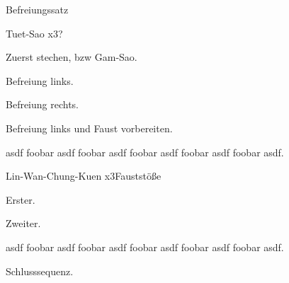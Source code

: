 
\begin{WTSatz}{Befreiungssatz}%

	
	\begin{WTSatzTeil}{Tuet-Sao x3}{?}
	
		Zuerst stechen, bzw Gam-Sao.
		
		
		Befreiung links.
		
		
		Befreiung rechts.
		
		
		Befreiung links und Faust vorbereiten.
		

		asdf foobar asdf foobar asdf foobar asdf foobar asdf foobar asdf.
	\end{WTSatzTeil}
	\begin{WTSatzTeil}{Lin-Wan-Chung-Kuen x3}{Faustst\"o{\ss}e}
		
		Erster.
	
		
		Zweiter.
		
		
		asdf foobar asdf foobar asdf foobar asdf foobar asdf foobar asdf.
		
		Schlusssequenz.
	\end{WTSatzTeil}
\end{WTSatz}






